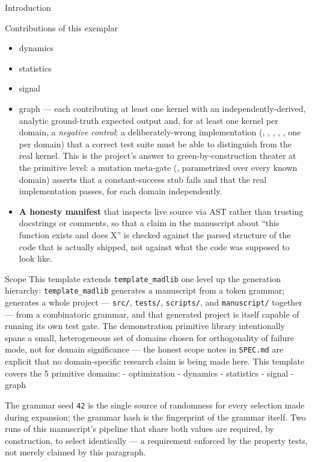 \documentclass[
  ignorenonframetext,
]{beamer}
\providecommand{\tightlist}{%
  \setlength{\itemsep}{0pt}\setlength{\parskip}{0pt}}
\begin{document}
\begin{frame}{Introduction}
\begin{block}{Contributions of this exemplar}
\begin{itemize}
  \begin{itemize}
  \tightlist
  \item
    optimization
  \end{itemize}
\item
  dynamics
\item
  statistics
\item
  signal
\item
  graph --- each contributing at least one kernel with an
  independently-derived, analytic ground-truth expected output and, for
  at least one kernel per domain, a \emph{negative control}: a
  deliberately-wrong implementation
  (,
  , ,
  ,
  , one per domain) that a correct test
  suite must be able to distinguish from the real kernel. This is the
  project's answer to green-by-construction theater at the primitive
  level: a mutation meta-gate (,
  parametrized over every known domain) asserts that a constant-success
  stub fails and that the real implementation passes, for each domain
  independently.
\item
  \textbf{A honesty manifest} that inspects live source via AST rather
  than trusting docstrings or comments, so that a claim in the
  manuscript about ``this function exists and does X'' is checked
  against the parsed structure of the code that is actually shipped, not
  against what the code was supposed to look like.
\end{itemize}
\end{block}

\begin{block}{Scope}
\protect{}\label{scope}
This template extends \texttt{template\_madlib} one level up the
generation hierarchy: \texttt{template\_madlib} generates a manuscript
from a token grammar;  generates a whole
project --- \texttt{src/}, \texttt{tests/}, \texttt{scripts/}, and
\texttt{manuscript/} together --- from a combinatoric grammar, and that
generated project is itself capable of running its own test gate. The
demonstration primitive library intentionally spans a small,
heterogeneous set of domains chosen for orthogonality of failure mode,
not for domain significance --- the honest scope notes in
\texttt{SPEC.md} are explicit that no domain-specific research claim is
being made here. This template covers the 5 primitive domains: -
optimization - dynamics - statistics - signal - graph

The grammar seed \texttt{42} is the single source of randomness for
every selection made during expansion; the grammar hash
 is the fingerprint of the grammar itself. Two
runs of this manuscript's pipeline that share both values are required,
by construction, to select identically --- a requirement enforced by the
property tests, not merely claimed by this paragraph.
\end{block}
\end{frame}
\end{document}
